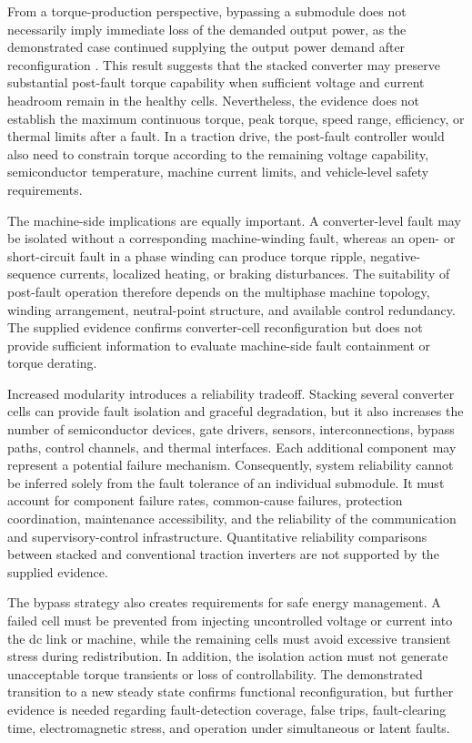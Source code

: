 From a torque-production perspective, bypassing a submodule does not necessarily imply immediate loss of the demanded output power, as the demonstrated case continued supplying the output power demand after reconfiguration \cite{Jin2017}. This result suggests that the stacked converter may preserve substantial post-fault torque capability when sufficient voltage and current headroom remain in the healthy cells. Nevertheless, the evidence does not establish the maximum continuous torque, peak torque, speed range, efficiency, or thermal limits after a fault. In a traction drive, the post-fault controller would also need to constrain torque according to the remaining voltage capability, semiconductor temperature, machine current limits, and vehicle-level safety requirements. %

The machine-side implications are equally important. A converter-level fault may be isolated without a corresponding machine-winding fault, whereas an open- or short-circuit fault in a phase winding can produce torque ripple, negative-sequence currents, localized heating, or braking disturbances. The suitability of post-fault operation therefore depends on the multiphase machine topology, winding arrangement, neutral-point structure, and available control redundancy. The supplied evidence confirms converter-cell reconfiguration but does not provide sufficient information to evaluate machine-side fault containment or torque derating. %

Increased modularity introduces a reliability tradeoff. Stacking several converter cells can provide fault isolation and graceful degradation, but it also increases the number of semiconductor devices, gate drivers, sensors, interconnections, bypass paths, control channels, and thermal interfaces. Each additional component may represent a potential failure mechanism. Consequently, system reliability cannot be inferred solely from the fault tolerance of an individual submodule. It must account for component failure rates, common-cause failures, protection coordination, maintenance accessibility, and the reliability of the communication and supervisory-control infrastructure. Quantitative reliability comparisons between stacked and conventional traction inverters are not supported by the supplied evidence. %

The bypass strategy also creates requirements for safe energy management. A failed cell must be prevented from injecting uncontrolled voltage or current into the dc link or machine, while the remaining cells must avoid excessive transient stress during redistribution. In addition, the isolation action must not generate unacceptable torque transients or loss of controllability. The demonstrated transition to a new steady state confirms functional reconfiguration, but further evidence is needed regarding fault-detection coverage, false trips, fault-clearing time, electromagnetic stress, and operation under simultaneous or latent faults. %

